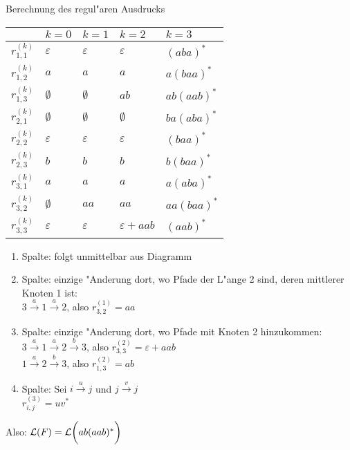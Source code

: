 \begin{slide}{}
\normalsize

\begin{center}
Berechnung des regul"aren Ausdrucks
\end{center}

\footnotesize
\hspace*{1.3cm}
\begin{tabular}{|l|l|l|l|l|}
\hline
                & $k = 0$ & $k = 1$ & $k = 2$ & $k = 3$ \\
\hline
\hline
$r_{1,1}^{(k)}$ & $\varepsilon$ & $\varepsilon$ & $\varepsilon$ & $(aba)^*$ \\
\hline
$r_{1,2}^{(k)}$ & $a$ & $a$ & $a$ & $a(baa)^*$ \\
\hline
$r_{1,3}^{(k)}$ & $\emptyset$ & $\emptyset$ & $ab$ & $ab(aab)^*$ \\
\hline
$r_{2,1}^{(k)}$ & $\emptyset$ & $\emptyset$  & $\emptyset$ & $ba(aba)^*$ \\
\hline
$r_{2,2}^{(k)}$ & $\varepsilon$ & $\varepsilon$ & $\varepsilon$ & $(baa)^*$ \\
\hline
$r_{2,3}^{(k)}$ & $b$ & $b$ & $b$ & $b(baa)^*$ \\
\hline
$r_{3,1}^{(k)}$ & $a$ & $a$ & $a$ & $a(aba)^*$ \\
\hline
$r_{3,2}^{(k)}$ & $\emptyset$ & $aa$ & $aa$ & $aa(baa)^*$ \\
\hline
$r_{3,3}^{(k)}$ & $\varepsilon$ & $\varepsilon$ & $\varepsilon + aab$ & $(aab)^*$ \\
\hline
\end{tabular}

\begin{enumerate}
\item Spalte: folgt unmittelbar aus Diagramm
      \vspace*{-0.5cm}
\item Spalte: einzige "Anderung dort, wo Pfade der L"ange 2 sind, deren mittlerer Knoten 1 ist: \\[0.3cm]
      \hspace*{1.3cm} $3 \stackrel{a}{\rightarrow} 1 \stackrel{a}{\rightarrow} 2$, also $r_{3,2}^{(1)} = aa$
      \vspace*{-0.5cm}
\item Spalte: einzige "Anderung dort, wo Pfade mit Knoten 2 hinzukommen: \\[0.3cm]
      \hspace*{1.3cm} $3 \stackrel{a}{\rightarrow} 1 \stackrel{a}{\rightarrow} 2 \stackrel{b}{\rightarrow} 3$, also $r^{(2)}_{3,3} = \varepsilon + aab$ \\[0.3cm]
      \hspace*{1.3cm} $1 \stackrel{a}{\rightarrow} 2 \stackrel{b}{\rightarrow} 3$, also $r_{1,3}^{(2)} = ab$
      \vspace*{-0.5cm}
\item Spalte: Sei $i \stackrel{u}{\rightarrow} j$ und $j \stackrel{v}{\rightarrow} j$ \\[0.3cm]
      \hspace*{1.3cm} $r_{i,j}^{(3)} = uv^*$ 
\end{enumerate}
Also: \quad ${\cal L}(F) = {\cal L}\bigg(ab(aab)^*\bigg)$


\end{slide}
